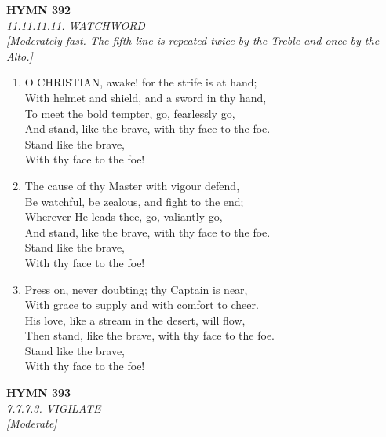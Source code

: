 \newpage
\begin{center}
    {\Large \textbf{HYMN 392}}
    \\
    \textit{11.11.11.11. WATCHWORD}
    \\
    \textit{\small [Moderately fast. The fifth line is repeated twice by the Treble and once by the Alto.]}
\end{center}
\vspace{1em}

\begin{enumerate}
    \item O CHRISTIAN, awake! for the strife is at hand; \\
        With helmet and shield, and a sword in thy hand, \\
        To meet the bold tempter, go, fearlessly go, \\
        And stand, like the brave, with thy face to the foe. \\
        Stand like the brave, \\
        With thy face to the foe!

    \item The cause of thy Master with vigour defend, \\
        Be watchful, be zealous, and fight to the end; \\
        Wherever He leads thee, go, valiantly go, \\
        And stand, like the brave, with thy face to the foe. \\
        Stand like the brave, \\
        With thy face to the foe!

    \item Press on, never doubting; thy Captain is near, \\
        With grace to supply and with comfort to cheer. \\
        His love, like a stream in the desert, will flow, \\
        Then stand, like the brave, with thy face to the foe. \\
        Stand like the brave, \\
        With thy face to the foe!

\end{enumerate}

\newpage
\begin{center}
    {\Large \textbf{HYMN 393}}
    \\
    \textit{7.7.7.3. VIGILATE}
    \\
    \textit{\small [Moderate]}
\end{center}
\vspace{1em}

